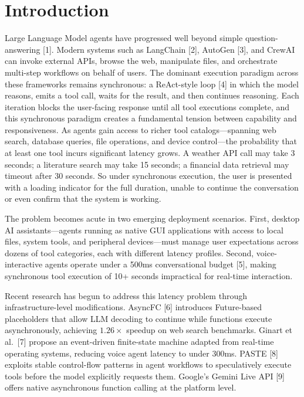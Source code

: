 \documentclass[numbered,mediumone,traditional]{oup-authoring-template}
\begin{document}
\section{Introduction}

Large Language Model agents have progressed well beyond simple question-answering [1]. Modern systems such as LangChain [2], AutoGen [3], and CrewAI can invoke external APIs, browse the web, manipulate files, and orchestrate multi-step workflows on behalf of users. The dominant execution paradigm across these frameworks remains synchronous: a ReAct-style loop [4] in which the model reasons, emits a tool call, waits for the result, and then continues reasoning. Each iteration blocks the user-facing response until all tool executions complete, and this synchronous paradigm creates a fundamental tension between capability and responsiveness. As agents gain access to richer tool catalogs---spanning web search, database queries, file operations, and device control---the probability that at least one tool incurs significant latency grows. A weather API call may take 3 seconds; a literature search may take 15 seconds; a financial data retrieval may timeout after 30 seconds. So under synchronous execution, the user is presented with a loading indicator for the full duration, unable to continue the conversation or even confirm that the system is working.

The problem becomes acute in two emerging deployment scenarios. First, desktop AI assistants---agents running as native GUI applications with access to local files, system tools, and peripheral devices---must manage user expectations across dozens of tool categories, each with different latency profiles. Second, voice-interactive agents operate under a 500ms conversational budget [5], making synchronous tool execution of 10+ seconds impractical for real-time interaction.

Recent research has begun to address this latency problem through infrastructure-level modifications. AsyncFC [6] introduces Future-based placeholders that allow LLM decoding to continue while functions execute asynchronously, achieving $1.26\times$ speedup on web search benchmarks. Ginart et al.\ [7] propose an event-driven finite-state machine adapted from real-time operating systems, reducing voice agent latency to under 300ms. PASTE [8] exploits stable control-flow patterns in agent workflows to speculatively execute tools before the model explicitly requests them. Google's Gemini Live API [9] offers native asynchronous function calling at the platform level.
\end{document}

